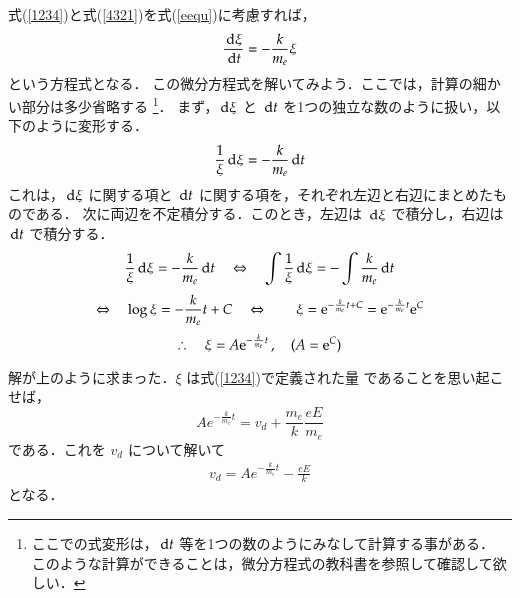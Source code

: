             式(\ref{1234})と式(\ref{4321})を式(\ref{eequ})に考慮すれば，
                \begin{align}\label{QQQ}
                    \frac{\df \xi}{\df t}=-\frac{k}{m_{e}}\xi
                \end{align}
            という方程式となる．
            この微分方程式を解いてみよう．ここでは，計算の細かい部分は多少省略する
                \footnote{
                    ここでの式変形は，$\,\mathrm{d} t$ 等を1つの数のようにみなして計算する事がある．
                    このような計算ができることは，微分方程式の教科書を参照して確認して欲しい．
                }．
            まず，$\,\mathrm{d} \xi$ と $\,\mathrm{d} t$ を1つの独立な数のように扱い，以下のように変形する．
                \begin{equation*}
                    \frac{1}{\xi}\,\mathrm{d}\xi = - \frac{k}{m_{e}}\,\mathrm{d} t
                \end{equation*}
            これは，$\,\mathrm{d} \xi$ に関する項と $\,\mathrm{d} t$ に関する項を，それぞれ左辺と右辺にまとめたものである．
            次に両辺を不定積分する．このとき，左辺は $\,\mathrm{d} \xi$ で積分し，右辺は $\,\mathrm{d} t$ で積分する．
                \begin{equation*}
                    \frac{1}{\xi}\,\mathrm{d} \xi = - \frac{k}{m_{e}}\,\mathrm{d} t
                    \quad\Leftrightarrow\quad
                    \int\frac{1}{\xi}\,\mathrm{d} \xi = - \int\frac{k}{m_{e}}\,\mathrm{d} t
                \end{equation*}
                \begin{equation*}
                    \Leftrightarrow\quad
                    \log\xi = -\frac{k}{m_{e}}t + C
                    \quad\Leftrightarrow\quad
                    \quad\xi = \mathrm{e}^{-\frac{k}{m_{e}}t+C} = \mathrm{e}^{-\frac{k}{m_{e}}t}\mathrm{e}^{C}
                \end{equation*}
                \begin{equation*}
                    \therefore\quad
                    \xi = A\mathrm{e}^{-\frac{k}{m_{e}}t}\,,\quad ( A = \mathrm{e}^{C})
                \end{equation*}

            解が上のように求まった．$\xi$   は式(\ref{1234})で定義された量
            であることを思い起こせば，
                \begin{equation*}
                    A e^{-\frac{k}{m_{e}}t}=v_{d}+\frac{m_{e}}{k}\frac{eE}{m_{e}}
                \end{equation*}
            である．これを $v_{d}$ について解いて
                \begin{align}
                    v_{d}=A e^{-\frac{k}{m_{e}}t} - \frac{eE}{k}
                \end{align}
            となる．

